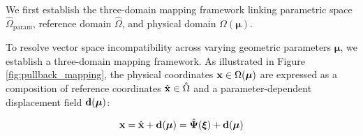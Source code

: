 We first establish the three-domain mapping framework linking parametric space $\hat{\Omega}_{\text{param}}$, reference domain $\hat{\Omega}$, and physical domain $\Omega(\boldsymbol{\mu})$.

To resolve vector space incompatibility across varying geometric parameters $\boldsymbol{\mu}$, we establish a three-domain mapping framework. As illustrated in Figure \ref{fig:pullback_mapping}, the physical coordinates $\mathbf{x} \in \Omega(\boldsymbol{\mu})$ are expressed as a composition of reference coordinates $\hat{\mathbf{x}} \in \hat{\Omega}$ and a parameter-dependent displacement field $\mathbf{d}(\boldsymbol{\mu})$:

\begin{equation}
    \mathbf{x} = \hat{\mathbf{x}} + \mathbf{d}(\boldsymbol{\mu}) = \hat{\boldsymbol{\Psi}}(\boldsymbol{\xi}) + \mathbf{d}(\boldsymbol{\mu})
\end{equation}

